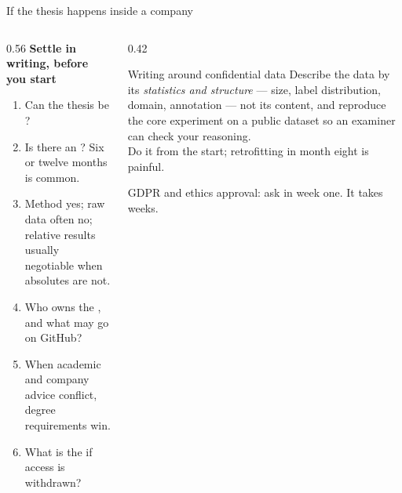 \documentclass[aspectratio=169,11pt]{beamer}
\begin{document}
\begin{frame}{If the thesis happens inside a company}
\begin{columns}[T]
\begin{column}{0.56\textwidth}
\textbf{Settle in writing, before you start}
\footnotesize
\begin{enumerate}
  \item Can the thesis be ?
  \item Is there an ? Six or twelve months is common.
  \item {} Method yes; raw data often no; relative results
        usually negotiable when absolutes are not.
  \item Who owns the , and what may go on GitHub?
  \item {} When academic and company advice conflict,
        degree requirements win.
  \item What is the  if access is withdrawn?
\end{enumerate}
\end{column}
\begin{column}{0.42\textwidth}
\begin{alertblock}{Writing around confidential data}
\footnotesize
Describe the data by its \emph{statistics and structure} --- size, label
distribution, domain, annotation --- not its content, and reproduce the core
experiment on a public dataset so an examiner can check your reasoning.\\[4pt]
Do it from the start; retrofitting in month eight is painful.
\end{alertblock}
\footnotesize
GDPR and ethics approval: ask in week one. It takes weeks.
\end{column}
\end{columns}
\end{frame}
\end{document}
